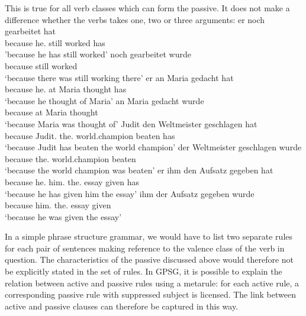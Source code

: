 \noindent
This is true for all verb classes which can form the passive. It does not make a difference whether the verbs takes one, two or three arguments:
\eal
\label{beispiel-arbeiten}
\ex 
\gll [weil] er noch gearbeitet hat\\
	 \spacebr{}because he.\nom{} still worked has\\
\glt 'because he has still worked'
\ex 
\gll [weil]    noch  gearbeitet wurde\\
     \spacebr{}because still worked     \AUX\\
\glt `because there was still working there'
\zl
\eal
\label{beispiel-denken}
\ex 
\gll [weil]    er        an Maria gedacht hat\\
     \spacebr{}because he.\nom{} at Maria thought has\\
\glt `because he thought of Maria'
\ex 
\gll [weil]    an Maria gedacht wurde\\
     \spacebr{}because at Maria thought \AUX\\
\glt `because Maria was thought of'
\zl
\eal
\ex 
\gll [weil] Judit den Weltmeister geschlagen hat\\
     \spacebr{}because Judit.\nom{} the.\acc{} world.champion beaten has\\
\glt `because Judit has beaten the world champion'
\ex 
\gll [weil] der Weltmeister geschlagen wurde\\
	 \spacebr{}because the.\nom{} world.champion beaten \AUX\\
\glt `because the world champion was beaten'
\zl
\eal
\ex 
\gll [weil] er ihm den Aufsatz gegeben hat\\
     \spacebr{}because he.\nom{} him.\dat{} the.\acc{} essay given has\\
\glt `because he has given him the essay'
\ex 
\gll [weil] ihm der Aufsatz gegeben wurde\\
     \spacebr{}because him.\dat{} the.\nom{} essay given \AUX\\
\glt `because he was given the essay'
\zl

\noindent
In a simple phrase structure grammar, we would have to list  two separate rules for each pair of sentences making reference to the valence class of the
verb in question. The characteristics of the passive discussed above would therefore not be
explicitly stated in the set of rules. In GPSG, it is possible to explain the relation between
active and passive rules using a metarule: for each active rule, a corresponding passive rule with suppressed subject is licensed.
The link between active and passive clauses can therefore be captured in this way.  

